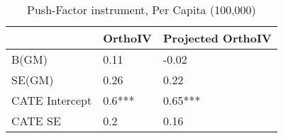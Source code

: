 \begin{table}\centering\caption{Push-Factor instrument, Per Capita (100,000)}\begin{tabular}{lll}
\toprule
                & OrthoIV   & Projected OrthoIV   \\
\midrule
 B(GM)          & 0.11      & -0.02               \\
 SE(GM)         & 0.26      & 0.22                \\
 CATE Intercept & 0.6***    & 0.65***             \\
 CATE SE        & 0.2       & 0.16                \\
\bottomrule
\end{tabular}\end{table}